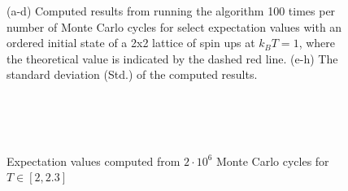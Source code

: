 \documentclass[10pt,showpacs,preprintnumbers,amsmath,amssymb,nofootinbib,aps,prl,twocolumn,groupedaddress,superscriptaddress,showkeys]{revtex4-1}
\begin{document}
\begin{figure}[h!p]
{    } 
    \caption{(a-d) Computed results from running the algorithm 100 times per number of Monte Carlo cycles for select expectation values with an ordered initial state of a 2x2 lattice of spin ups at $k_BT = 1$, where the theoretical value is indicated by the dashed red line. (e-h) The standard deviation (Std.) of the computed results.}
    \label{fig:convergence 2x2} 
  \end{figure}


  \begin{figure}[h!p]
    \center
    \\
    \\
    \\
    \caption{\label{fig:phase transitions} Expectation values computed from $2\cdot10^6$ Monte Carlo cycles for $T \in [2, 2.3]$}
  \end{figure}
\end{document}
